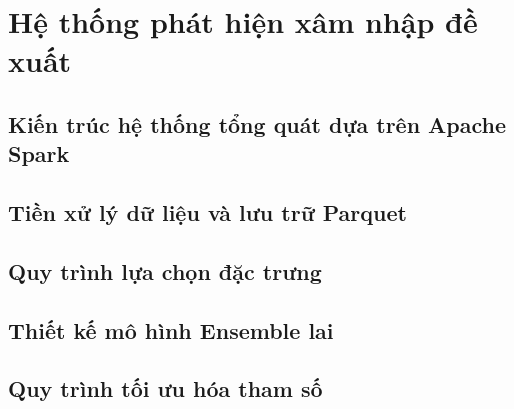 \chapter{Hệ thống phát hiện xâm nhập đề xuất}

\section{Kiến trúc hệ thống tổng quát dựa trên Apache Spark}

\section{Tiền xử lý dữ liệu và lưu trữ Parquet}

\section{Quy trình lựa chọn đặc trưng}

\section{Thiết kế mô hình Ensemble lai}




\section{Quy trình tối ưu hóa tham số}
